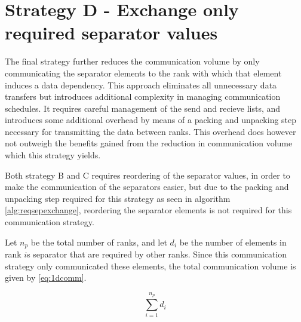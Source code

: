 \section{Strategy D - Exchange only required separator values}
The final strategy further reduces the communication volume by only communicating the separator elements to the rank with which that element induces a data dependency. This approach eliminates all unnecessary data transfers but introduces additional complexity in managing communication schedules. It requires careful management of the send and recieve lists, and introduces some additional overhead by means of a packing and unpacking step necessary for transmitting the data between ranks. This overhead does however not outweigh the benefits gained from the reduction in communication volume which this strategy yields.
\medskip

Both strategy B and C requires reordering of the separator values, in order to make the communication of the separators easier, but due to the packing and unpacking step required for this strategy as seen in algorithm \ref{alg:reqsepexchange}, reordering the separator elements is not required for this communication strategy.
\medskip

Let \(n_{p}\) be the total number of ranks, and let \(d_{i}\) be the number of elements in rank \(i\)s separator that are required by other ranks. Since this communication strategy only communicated these elements, the total communication volume is given by \ref{eq:1dcomm}.

\begin{equation}
    \label{eq:1dcomm}
    \sum_{i=1}^{n_{p}} d_{i} 
\end{equation}

